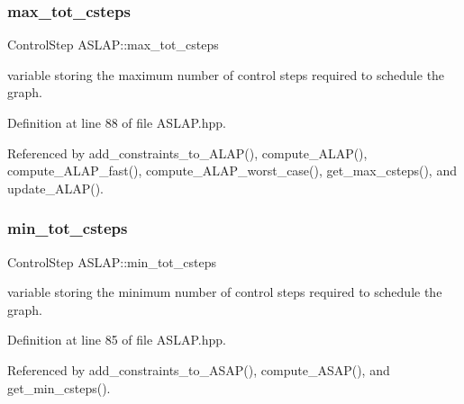 \mbox{\label{classASLAP_adabce842c92f34d9d94d7c7163359bc4}} 
\subsubsection{\texorpdfstring{max\+\_\+tot\+\_\+csteps}{max\_tot\_csteps}}
{\footnotesize\ttfamily Control\+Step A\+S\+L\+A\+P\+::max\+\_\+tot\+\_\+csteps\hspace{0.3cm}{\ttfamily [private]}}



variable storing the maximum number of control steps required to schedule the graph. 



Definition at line 88 of file A\+S\+L\+A\+P.\+hpp.



Referenced by add\+\_\+constraints\+\_\+to\+\_\+\+A\+L\+A\+P(), compute\+\_\+\+A\+L\+A\+P(), compute\+\_\+\+A\+L\+A\+P\+\_\+fast(), compute\+\_\+\+A\+L\+A\+P\+\_\+worst\+\_\+case(), get\+\_\+max\+\_\+csteps(), and update\+\_\+\+A\+L\+A\+P().

\mbox{\label{classASLAP_a1659d33460fa862951f6e6e97b88d3c3}} 
\subsubsection{\texorpdfstring{min\+\_\+tot\+\_\+csteps}{min\_tot\_csteps}}
{\footnotesize\ttfamily Control\+Step A\+S\+L\+A\+P\+::min\+\_\+tot\+\_\+csteps\hspace{0.3cm}{\ttfamily [private]}}



variable storing the minimum number of control steps required to schedule the graph. 



Definition at line 85 of file A\+S\+L\+A\+P.\+hpp.



Referenced by add\+\_\+constraints\+\_\+to\+\_\+\+A\+S\+A\+P(), compute\+\_\+\+A\+S\+A\+P(), and get\+\_\+min\+\_\+csteps().

\mbox{\label{classASLAP_a90fd3ac454f4224f8ac7b57da07b59d3}} 
